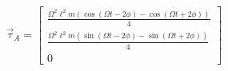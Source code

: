 \documentclass[11pt, a4paper, twoside]{article}
\begin{document}
\begin{enumerate}
\[			\qquad
				\vec{\tau}_A = \left[\begin{matrix}\frac{\Omega^{2} \ell^{2} m \left(\cos{\left(\Omega t - 2 \phi \right)} - \cos{\left(\Omega t + 2 \phi \right)}\right)}{4}\\\frac{\Omega^{2} \ell^{2} m \left(\sin{\left(\Omega t - 2 \phi \right)} - \sin{\left(\Omega t + 2 \phi \right)}\right)}{4}\\0\end{matrix}\right]
			\]


	\end{enumerate}
\end{document}
